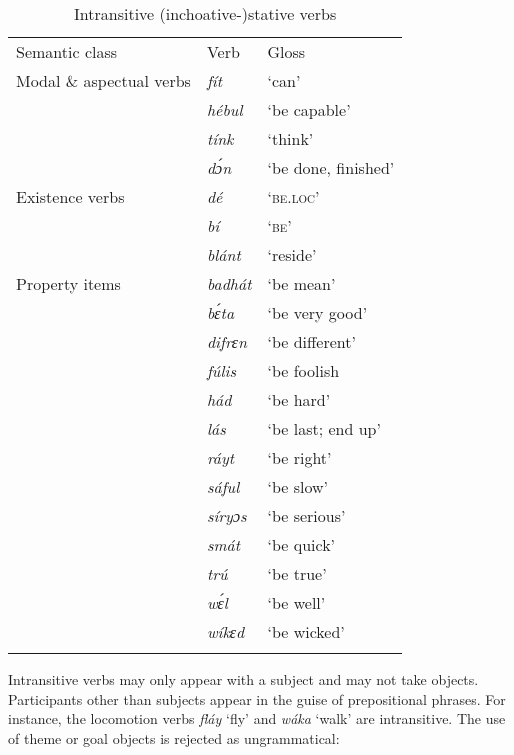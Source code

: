 \begin{table}
\caption{Intransitive (inchoative-)stative verbs}
\label{tab:key:9.4}

\begin{tabularx}{\textwidth}{lXX}
\lsptoprule

Semantic class & Verb & Gloss\\
Modal \& aspectual verbs & \itshape fít & ‘can’\\
& \itshape hébul & ‘be capable’\\
& \itshape tínk & ‘think’\\
& \itshape dɔ́n & ‘be done, finished’\\
Existence verbs & \itshape dé & \textsc{‘be.loc’}\\
& \itshape bí & \textsc{‘be’}\\
& \itshape blánt & ‘reside’\\
Property items & \itshape badhát & ‘be mean’\\
& \itshape bɛ́ta & ‘be very good’\\
& \itshape difrɛn & ‘be different’\\
& \itshape fúlis & ‘be foolish\\
& \itshape hád & ‘be hard’\\
& \itshape lás & ‘be last; end up’\\
& \itshape ráyt & ‘be right’\\
& \itshape sáful & ‘be slow’\\
& \itshape síryɔs & ‘be serious’\\
& \itshape smát & ‘be quick’\\
& \itshape trú & ‘be true’\\
& \itshape wɛ́l & ‘be well’\\
& \itshape wíkɛd & ‘be wicked’\\
\lspbottomrule
\end{tabularx}
\end{table}
Intransitive verbs may only appear with a subject and may not take objects. Participants other than subjects appear in the guise of prepositional phrases. For instance, the locomotion verbs \textit{fláy} ‘fly’ and \textit{wáka} ‘walk’ are intransitive. The use of theme  or goal objects  is rejected as ungrammatical:


\z


